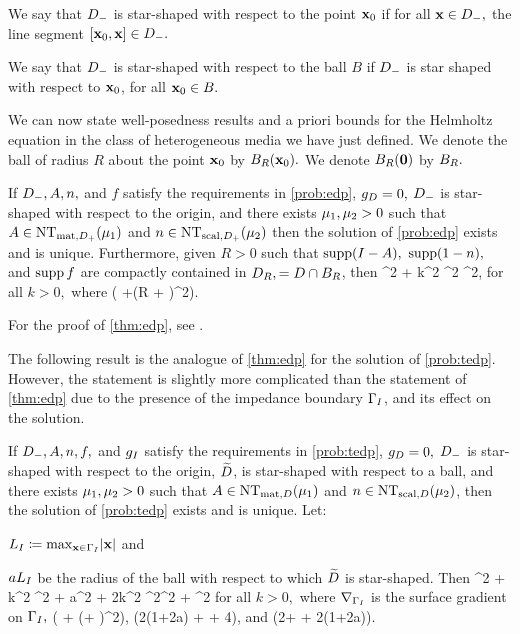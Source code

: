   We say that $D_{-}$ is star-shaped with respect to the point $\mathbf{x}_{0}$ if for all $\mathbf{x} \in D_{-},$ the line segment $\mleft[\bxz,\bx\mright] \in \Dm.$

  We say that $D_{-}$ is star-shaped with respect to the ball $B$ if $D_{-}$ is star shaped with respect to $\mathbf{x}_{0}$, for all $\mathbf{x}_{0} \in B.$
  \ede

We can now state well-posedness results and a priori bounds for the Helmholtz equation in the class of heterogeneous media we have just defined.  We denote the ball of radius $R$ about the point $\mathbf{x}_{0}$ by $\Ball{R}{\bxz}.$ We denote $\Ball{R}{\bfzero}$ by $B_{R}.$



\label{thm:edp}
If $D_{-}, A, n,$ and $f$ satisfy the requirements in \cref{prob:edp}, $g_{D} = 0,$ $D_{-}$ is star-shaped with respect to the origin, and there exists $\mu_{1}, \mu_{2} > 0$ such that $A \in \NTADp{\muo}$ and $n \in \NTnDp{\mut}$ then the solution of \cref{prob:edp} exists and is unique. Furthermore, given $R>0$ such that $\supp\mleft(I-A\mright),$ $\operatorname{supp}(1-n),$ and $\operatorname{supp} f$ are compactly contained in $D_{R}, = D \cap B_{R}$, then
\beqs
\muo {}^2 + \mut k^2 ^2 \leq \Co {}^2,
\eeqs
for all $k>0,$ where
\beqs
\Co {}\mleft( +\mleft(R + \mright)^2\mright).
\eeqs
\enth

For the proof of \cref{thm:edp}, see \cite[Theorem 2.5]{GrPeSp:19}.

The following result is the analogue of \cref{thm:edp} for the solution of \cref{prob:tedp}. However, the statement is slightly more complicated than the statement of \cref{thm:edp} due to the presence of the impedance boundary $\Gamma_{I}$, and its effect on the solution.

\label{thm:tedp}
If $D_{-}, A, n, f,$ and $g_{I}$ satisfy the requirements in \cref{prob:tedp}, $g_{D} = 0,$ $D_{-}$ is star-shaped with respect to the origin, $\widetilde{D}$, is star-shaped with respect to a ball, and there exists $\mu_{1}, \mu_{2} > 0$ such that $A \in \NTAD{\muo}$ and $n \in \NTnD{\mut}$, then the solution of \cref{prob:tedp} exists and is unique. Let:
\bit
\item $\LI \de \max_{\bx \in \GI} \abs{\bx}$ and
\item $aL_{I}$ be the radius of the ball with respect to which $\widetilde{D}$ is star-shaped.
    \eit
Then
\beqs
  \muo {}^2 + \mut k^2 ^2 + a\LI{}^2 + 2\LI k^2 ^2\leq \Ct {}^2 + \Cttilde \NLtGI{\gI}^2
\eeqs
for all $k>0,$ where $\nabla_{\Gamma_{I}}$ is the surface gradient on $\Gamma_{I},$
\beqs
\Ct {}\mleft( + \mleft(\beta + \mright)^2\mright),
\eeqs
\beqs
\Cttilde {}\mleft(2\mleft(1+\frac2a\mright) + \frac\beta{\LI} + 4\mright)\LI,
\eeqs
and
\beqs
\beta \de \LI \mleft(2+ + 2\mleft(1+\frac2a\mright)\mright).
\eeqs
\enth

